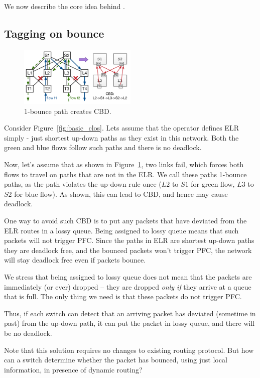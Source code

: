 We now describe the core idea behind \sysname{}.

\subsection{Tagging on bounce}
\label{subsec:tag}

\begin{figure}[t]
	\centering
	\includegraphics[width=0.5\textwidth] {figs/cbd_a}
	\caption{1-bounce path creates CBD.}
	\label{fig:clos_1_bounce}
\end{figure}

Consider Figure~\ref{fig:basic_clos}. Lets assume that the operator defines ELR
simply - just shortest up-down paths as they exist in this network.  Both the
green and blue flows follow such paths and there is no deadlock.

Now, let's assume that as shown in Figure~\ref{fig:clos_1_bounce}, two links
fail, which forces both flows to travel on paths that are not in the ELR. We
call these paths 1-bounce paths, as the path violates the up-down rule once
($L2$ to $S1$ for green flow, $L3$ to $S2$ for blue flow). As shown, this can
lead to CBD, and hence may cause deadlock.

One way to avoid such CBD is to put any packets that have deviated from the ELR
routes in a lossy queue.  Being assigned to lossy queue means that such packets
will not trigger PFC. Since the paths in ELR are shortest up-down paths they are
deadlock free, and the bounced packets won't trigger PFC, the network will stay
deadlock free even if packets bounce.

We stress that being assigned to lossy queue does not mean that the packets are
immediately (or ever) dropped -- they are dropped {\em only if} they arrive at a
queue that is full. The only thing we need is that these packets do not trigger
PFC.

Thus, if each switch can detect that an arriving packet has deviated (sometime
in past) from the up-down path, it can put the packet in lossy queue, and there will be
no deadlock.

Note that this solution requires no changes to existing routing protocol.  But
how can a switch determine whether the packet has bounced, using just local
information, in presence of dynamic routing?

